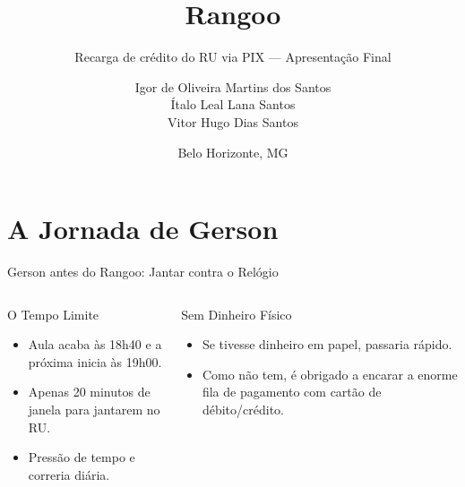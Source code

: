\documentclass[10pt, aspectratio=169]{beamer}
\title{Rangoo}
\subtitle{Recarga de crédito do RU via PIX --- Apresentação Final}
\author[Boliñas de Gorfe]{%
  \begin{tabular}{@{}l@{}}
    Igor de Oliveira Martins dos Santos \\
    Ítalo Leal Lana Santos \\
    Vitor Hugo Dias Santos
  \end{tabular}%
}
\date{Belo Horizonte, MG}
\begin{document}
\maketitle

\section{A Jornada de Gerson}

\begin{frame}{Gerson antes do Rangoo: Jantar contra o Relógio}
  \begin{columns}[T,onlytextwidth]
      \begin{block}{O Tempo Limite}
        \small
        \begin{itemize}
          \item Aula acaba às 18h40 e a próxima inicia às 19h00.
          \item Apenas 20 minutos de janela para jantarem no RU.
          \item Pressão de tempo e correria diária.
        \end{itemize}
      \end{block}

      \begin{block}{Sem Dinheiro Físico}
        \small
        \begin{itemize}
          \item Se tivesse dinheiro em papel, passaria rápido.
          \item Como não tem, é obrigado a encarar a enorme fila de pagamento com cartão de débito/crédito.
        \end{itemize}
      \end{block}
  \end{columns}
\end{frame}
\end{document}
